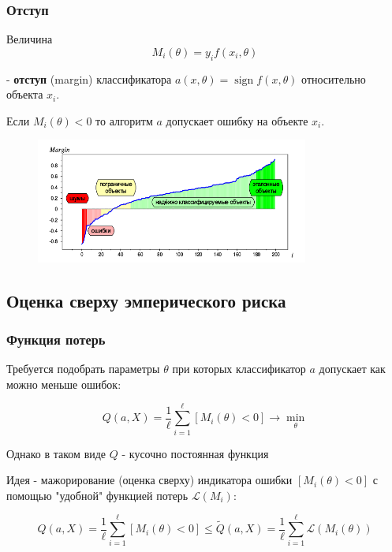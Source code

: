 \documentclass{beamer}
\DeclareMathOperator{\sign}{sign}
\begin{document}
	\begin{frame}
		\frametitle{Отступ}
		
		Величина 
		\[
		M_i(\theta) = y_i f(x_i, \theta)
		\]
		
		 - \textbf{отступ} (margin) классификатора $a(x, \theta) = \sign f(x, \theta)$ относительно объекта $x_i$.
		
		\vspace{5pt}
		
		Если $M_i(\theta) < 0$ то алгоритм $a$ допускает ошибку на объекте $x_i$. 
		
		
		
		\begin{figure}
			\centering
			\includegraphics[width=0.8\textwidth]{img/margin}  
		\end{figure}
		
	\end{frame}
	
	\subsection{Оценка сверху эмперического риска}
	
	\begin{frame}
		\frametitle{Функция потерь}
		Требуется подобрать параметры $\theta$ при которых классификатор $a$ допускает как можно меньше ошибок:
		
		\[
		Q(a, X) = \frac{1}{\ell} \sum_{i=1}^{\ell} [M_i(\theta) < 0] \rightarrow \min_{\theta}
		\]
		
		Однако в таком виде $Q$ - кусочно постоянная функция
		
		\vspace{15pt}
		
		Идея - мажорирование (оценка сверху) индикатора ошибки $[M_i(\theta) < 0]$ с помощью "удобной" функцией потерь $\mathcal{L}(M_i)$:
		
		\[
		Q(a, X) = \frac{1}{\ell} \sum_{i=1}^{\ell} [M_i(\theta) < 0]
		\le
		\widetilde{Q}(a, X) = \frac{1}{\ell} \sum_{i=1}^{\ell} \mathcal{L}(M_i(\theta))
		\]
	\end{frame}
	
\end{document}
